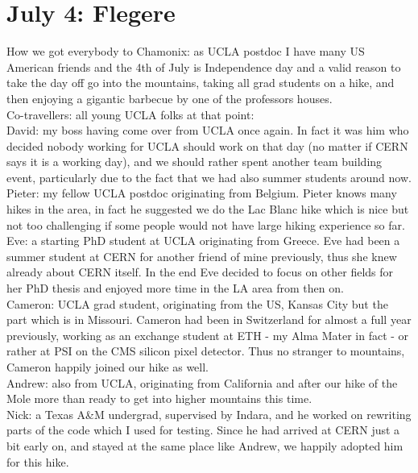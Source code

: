 \section{July 4: Flegere}
\label{Flegere2013}

How we got everybody to Chamonix: as UCLA postdoc I have many US American friends and the 4th of July is Independence day and a valid reason to take the day off go into the mountains, taking all grad students on a hike, and then enjoying a gigantic barbecue by one of the professors houses. \\

Co-travellers: all young UCLA folks at that point:\\
David: my boss having come over from UCLA once again. In fact it was him who decided nobody working for UCLA should work on that day (no matter if CERN says it is a working day), and we should rather spent another team building event, particularly due to the fact that we had also summer students around now.\\
Pieter: my fellow UCLA postdoc originating from Belgium. Pieter knows many hikes in the area, in fact he suggested we do the Lac Blanc hike which is nice but not too challenging if some people would not have large hiking experience so far.\\
Eve: a starting PhD student at UCLA originating from Greece. Eve had been a summer student at CERN for another friend of mine previously, thus she knew already about CERN itself. In the end Eve decided to focus on other fields for her PhD thesis and enjoyed more time in the LA area from then on.\\
Cameron: UCLA grad student, originating from the US, Kansas City but the part which is in Missouri. Cameron had been in Switzerland for almost a full year previously, working as an exchange student at ETH - my Alma Mater in fact -  or rather at PSI on the CMS silicon pixel detector. Thus no stranger to mountains, Cameron happily joined our hike as well.\\
Andrew: also from UCLA, originating from California and after our hike of the Mole more than ready to get into higher mountains this time.\\
Nick: a Texas A\&M undergrad, supervised by Indara, and he worked on rewriting parts of the code which I used for testing. Since he had arrived at CERN just a bit early on, and stayed at the same place like Andrew, we happily adopted him for this hike.\\

